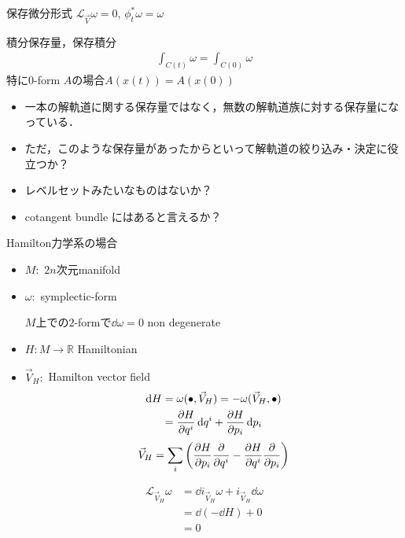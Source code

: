 \documentclass[dvipdfmx]{beamer}
\theoremstyle{break}
\newcommand{\R}{\mathbb{R}}
\renewcommand{\L}{\mathcal{L}}
\begin{document}
\begin{frame}
			\begin{block}{保存微分形式}
					$\L_{\vec{V}}\omega = 0 $, $\phi_t^{*} \omega = \omega$
			\end{block}
			\begin{block}{積分保存量，保存積分}
					\begin{align}
							\int_{C(t)}\omega = \int_{C(0)}\omega
					\end{align}
					特に$0 $-form $A $の場合$A(x(t)) = A(x(0)) $
			\end{block}
			\begin{itemize}
					\item 一本の解軌道に関する保存量ではなく，無数の解軌道族に対する保存量になっている．

					\item ただ，このような保存量があったからといって解軌道の絞り込み・決定に役立つか？

					\item レベルセットみたいなものはないか？

					\item cotangent bundle にはあると言えるか？
			\end{itemize}
\end{frame}


\begin{frame}{Hamilton力学系の場合}
		\begin{itemize}
				\item $M\colon $ $2n $次元manifold
				\item $\omega\colon $ symplectic-form

						$M $上での$2 $-formで$\dd{\omega} = 0 $ non degenerate
				\item $H\colon M\to \R $ Hamiltonian
				\item $\vec{V}_H\colon $ Hamilton vector field
						\begin{align}
								\dd{H} &= \omega (\bullet, \vec{V}_H) = -\omega (\vec{V}_H, \bullet)\\
									   &= \pdv{H}{q^i}\dd{q^i} + \pdv{H}{p_i}\dd{p_i}
						\end{align}
				\begin{align}
						\vec{V}_H = \sum_i\qty(\pdv{H}{p_i}\pdv{}{q^i} - \pdv{H}{q^i}\pdv{}{p_i})
				\end{align}
		\end{itemize}
\end{frame}

\begin{frame}
		\begin{align}
				\L_{\vec{V}_H}\omega &= \dd{i_\vec{V}_H}\omega + i_{\vec{V}_H}\dd{\omega}\\
									 &= \dd(-\dd{H}) + 0\\
									  &= 0
		\end{align}
\end{frame}
\end{document}
